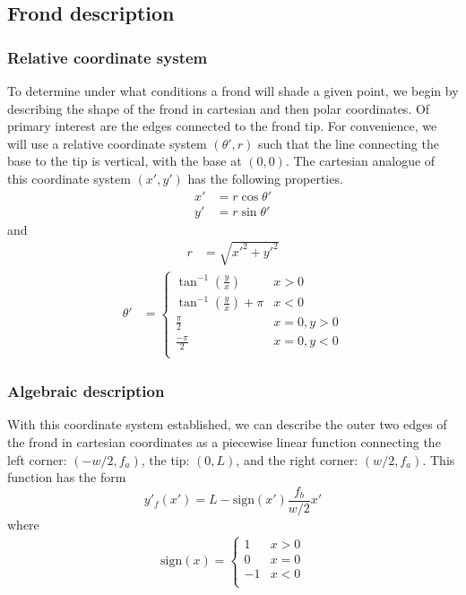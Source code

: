 \documentclass{article}
\newcommand{\sign}{\mbox{sign}}
\begin{document}
\begin{multicols}{2}
\subsection{Frond description}
\subsubsection{Relative coordinate system}
\label{sec:coords}
To determine under what conditions a frond will shade a given point, we begin by describing the shape of the frond in cartesian and then polar coordinates.
Of primary interest are the edges connected to the frond tip.
For convenience, we will use a relative coordinate system $(\theta',r)$ such that the line connecting the base to the tip is vertical, with the base at $(0,0)$.
The cartesian analogue of this coordinate system $(x',y')$ has the following properties.
\begin{align}
	x' &= r\cos\theta' \\ 
	y' &= r\sin\theta'
\end{align}
and
\begin{align}
	r &= \sqrt{x'^2+y'^2}
\end{align}
\vspace{-1em}
\begin{align}
	\theta' &= 
	\begin{cases}
		\tan^{-1}\left( \frac{y}{x} \right) & x > 0 \\
		\tan^{-1}\left( \frac{y}{x} \right) + \pi & x < 0 \\
		\frac{\pi}{2} & x = 0, y > 0 \\
		\frac{-\pi}{2} & x = 0, y < 0 \\
	\end{cases}
\end{align}

\subsubsection{Algebraic description}
With this coordinate system established, we can describe the outer two edges of the frond in cartesian coordinates as a piecewise linear function connecting the left corner: $(-w/2,f_a)$, the tip: $(0,L)$, and the right corner: $(w/2,f_a)$.
This function has the form
\begin{equation}
	y'_f(x') = L-\sign(x')\frac{f_b}{w/2}x'
\end{equation}
where
\begin{align}
	\sign(x) = 
	\begin{cases}
		1 & x > 0 \\
		0 & x = 0 \\
		-1 & x < 0 \\
	\end{cases}
\end{align}


\end{multicols}
\end{document}
